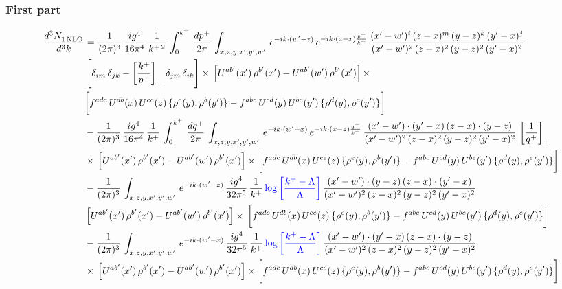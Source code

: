 \documentclass[9pt]{article}
\numberwithin{equation}{section}
\begin{document}
\subsubsection*{First part}
\begin{align}
     \frac{d^{3}N_{1\,\rm NLO}^{\rm}}{d^{3}k}  & = \frac{1}{(2\pi)^{3}}\, \frac{ig^{4}}{16\pi^{4}}\, \frac{1}{k^{+\,2}}\,\int_{0}^{k^{+}}\, \frac{dp^{+}}{2\pi}\,\int_{x,z,y,x',y',w'}\,e^{-ik\cdot (w^\prime-z)}\,e^{-ik\cdot (z-x)\frac{p^{+}}{k^{+}}}\,\frac{(x'-w')^{i}\,(z-x)^{m}\,(y-z)^{k}\,(y'-x)^{j}}{(x'-w')^{2}\,(z-x)^{2}\,(y-z)^{2}\,(y'-x)^{2}}\,\notag \\ & \left[\delta_{im}\,\delta_{jk}-\left[\frac{k^{+}}{p^{+}}\right]_{+}\, \delta_{jm}\,\delta_{ik}\right]\times\, \left[U^{ab'}(x')\,\rho^{b'}(x')-U^{ab'}(w')\,\rho^{b'}(x')\right]\times\notag \\ & \bigg[f^{adc}\,U^{db}(x)\,U^{ce}(z)\, \{\rho^{e}(y),\rho^{b}(y')\}-f^{abc}\,U^{cd}(y)\,U^{be}(y')\, \{\rho^{d}(y),\rho^{e}(y')\}\bigg]\notag \\ & -\frac{1}{(2\pi)^{3}}\, \frac{ig^{4}}{16\pi^{4}}\, \frac{1}{k^{+}}\,\int_{0}^{k^{+}}\, \frac{dq^{+}}{2\pi}\,\int_{x,z,y,x',y',w'}\,e^{-ik\cdot (w^\prime-x)}\,e^{-ik\cdot (x-z)\frac{q^{+}}{k^{+}}}\,\frac{(x'-w')\cdot (y'-x)\,(z-x)\cdot (y-z)}{(x'-w')^{2}\,(z-x)^{2}\,(y-z)^{2}\,(y'-x)^{2}}\,\left[\frac{1}{q^{+}}\right]_{+}\notag \\ & \times\, \left[U^{ab'}(x')\,\rho^{b'}(x')-U^{ab'}(w')\,\rho^{b'}(x')\right]\times \bigg[f^{adc}\,U^{db}(x)\,U^{ce}(z)\, \{\rho^{e}(y),\rho^{b}(y')\}-f^{abc}\,U^{cd}(y)\,U^{be}(y')\, \{\rho^{d}(y),\rho^{e}(y')\}\bigg]\notag \\ & -\frac{1}{(2\pi)^{3}}\, \int_{x,z,y,x',y',w'}\,e^{-ik\cdot (w^\prime-z)}\,\frac{ig^{4}}{32\pi^{5}}\, \frac{1}{k^{+}}\,{\color{blue}\log{\left[\frac{k^{+}-\Lambda}{\Lambda}\right]}}\,\frac{(x'-w')\cdot (y-z)\,(z-x)\cdot (y'-x)}{(x'-w')^{2}\,(z-x)^{2}\,(y-z)^{2}\,(y'-x)^{2}}\,\notag \\ & \left[U^{ab'}(x')\,\rho^{b'}(x')-U^{ab'}(w')\,\rho^{b'}(x')\right]\times\, \bigg[f^{adc}\,U^{db}(x)\,U^{ce}(z)\, \{\rho^{e}(y),\rho^{b}(y')\}-f^{abc}\,U^{cd}(y)\,U^{be}(y')\, \{\rho^{d}(y),\rho^{e}(y')\}\bigg]\notag \\ &  -\frac{1}{(2\pi)^{3}}\, \int_{x,z,y,x',y',w'}\,e^{-ik\cdot (w^\prime-x)}\,\frac{ig^{4}}{32\pi^{5}}\, \frac{1}{k^{+}}\,{\color{blue}\log{\left[\frac{k^{+}-\Lambda}{\Lambda}\right]}}\,\frac{(x'-w')\cdot (y'-x)\,(z-x)\cdot (y-z)}{(x'-w')^{2}\,(z-x)^{2}\,(y-z)^{2}\,(y'-x)^{2}}\notag \\ & \times\, \left[U^{ab'}(x')\,\rho^{b'}(x')-U^{ab'}(w')\,\rho^{b'}(x')\right]\times \bigg[f^{adc}\,U^{db}(x)\,U^{ce}(z)\, \{\rho^{e}(y),\rho^{b}(y')\}-f^{abc}\,U^{cd}(y)\,U^{be}(y')\, \{\rho^{d}(y),\rho^{e}(y')\}\bigg]
\end{align}
\end{document}
